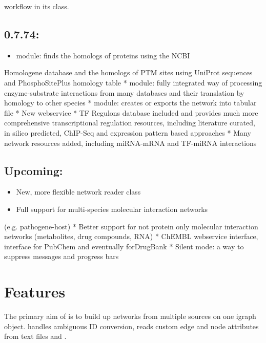 \documentclass[letterpaper,10pt,english]{sphinxmanual}
\begin{document}
workflow in its  class.


\section{0.7.74:}
\label{\detokenize{index:id6}}\begin{itemize}
\item {} 
 module: finds the homologs of proteins using the NCBI

\end{itemize}

Homologene database and the homologs of PTM sites using UniProt sequences
and PhosphoSitePlus homology table
*  module: fully integrated way of processing enzyme-substrate
interactions from many databases and their translation by homology to other
species
*  module: creates  or exports the network into
tabular file
* New webservice
* TF Regulons database included and provides much more comprehensive
transcriptional regulation resources, including literature curated, in silico
predicted, ChIP-Seq and expression pattern based approaches
* Many network resources added, including miRNA-mRNA and TF-miRNA interactions


\section{Upcoming:}
\label{\detokenize{index:upcoming}}\begin{itemize}
\item {} 
New, more flexible network reader class

\item {} 
Full support for multi-species molecular interaction networks

\end{itemize}

(e.g. pathogene-host)
* Better support for not protein only molecular interaction networks
(metabolites, drug compounds, RNA)
* ChEMBL webservice interface, interface for PubChem and eventually
forDrugBank
* Silent mode: a way to suppress messages and progress bars


\chapter{Features}
\label{\detokenize{index:features}}
The primary aim of  is to build up networks from multiple sources on
one igraph object.  handles ambiguous ID conversion, reads custom
edge and node attributes from text files and .
\end{document}
